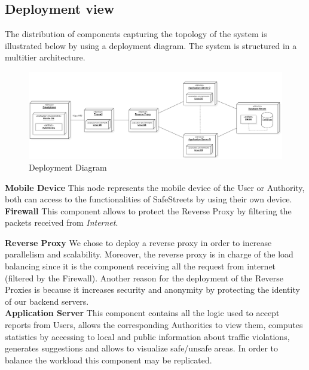 \subsection{Deployment view}
The distribution of components capturing the topology of the system is illustrated below by using a deployment diagram.\newline
The system is structured in a multitier architecture.
\newline
\begin{figure}[H]
\centering
          \includegraphics[width=1.25\textwidth,left]{Images/deployment_diagram.png}
        \caption{Deployment Diagram}
\end{figure}

\noindent\textbf{Mobile Device}\newline
This node represents the mobile device of the User or Authority, both can access to the functionalities of SafeStreets by using their own device.\\

\noindent\textbf{Firewall}\newline
This component allows to protect the Reverse Proxy by filtering the packets received from \textit{Internet}.\newline

\noindent\textbf{Reverse Proxy}\newline
We chose to deploy a reverse proxy in order to increase parallelism and scalability. Moreover, the reverse proxy is in charge of the load balancing since it is the component receiving all the request from internet (filtered by the Firewall). Another reason for the deployment of the Reverse Proxies is because it increases security and anonymity by protecting the identity of our backend servers.\\

\noindent\textbf{Application Server}\newline
This component contains all the logic used to accept reports from Users, allows the corresponding Authorities to view them, computes statistics by accessing to local and public information about traffic violations, generates suggestions and allows to visualize safe/unsafe areas. In order to balance the workload this component may be replicated.\newline


